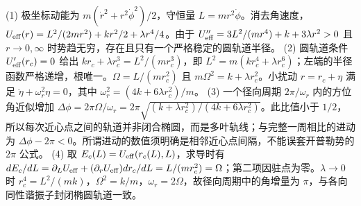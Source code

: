 (1) 极坐标动能为 \(m(\dot r^2+r^2\dot\phi^2)/2\)，守恒量 \(L=mr^2\dot\phi\)。消去角速度，\(U_{\rm eff}(r)=L^2/(2mr^2)+kr^2/2+\lambda r^4/4\)。由于 \(U_{\rm eff}''=3L^2/(mr^4)+k+3\lambda r^2>0\) 且 \(r\to0,\infty\) 时势趋无穷，存在且只有一个严格稳定的圆轨道半径。
(2) 圆轨道条件 \(U_{\rm eff}'(r_c)=0\) 给出 \(kr_c+\lambda r_c^3=L^2/(mr_c^3)\)，即 \(L^2=m(kr_c^4+\lambda r_c^6)\)；左端的半径函数严格递增，根唯一。\(\Omega=L/(mr_c^2)\) 且 \(m\Omega^2=k+\lambda r_c^2\)。小扰动 \(r=r_c+\eta\) 满足 \(\ddot\eta+\omega_r^2\eta=0\)，其中 \(\omega_r^2=(4k+6\lambda r_c^2)/m\)。
(3) 一个径向周期 \(2\pi/\omega_r\) 内的方位角近似增加 \(\Delta\phi=2\pi\Omega/\omega_r=2\pi\sqrt{(k+\lambda r_c^2)/(4k+6\lambda r_c^2)}\)。此比值小于 \(1/2\)，所以每次近心点之间的轨道并非闭合椭圆，而是多叶轨线；与完整一周相比的进动为 \(\Delta\phi-2\pi<0\)。所谓进动的数值须明确是相邻近心点间隔，不能误套开普勒势的 \(2\pi\) 公式。
(4) 取 \(E_c(L)=U_{\rm eff}(r_c(L),L)\)，求导时有 \(dE_c/dL=\partial_LU_{\rm eff}+(\partial_rU_{\rm eff})dr_c/dL=L/(mr_c^2)=\Omega\)；第二项因驻点为零。\(\lambda\to0\) 时 \(r_c^4=L^2/(mk)\)，\(\Omega^2=k/m\)，\(\omega_r=2\Omega\)，故径向周期中的角增量为 \(\pi\)，与各向同性谐振子封闭椭圆轨道一致。
